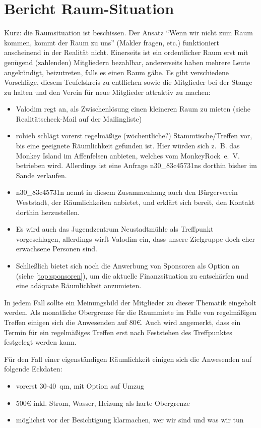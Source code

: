 \documentclass[a4paper,12pt]{scrartcl}
\begin{document}
\section{Bericht Raum-Situation}
\label{top:raum}
Kurz: die Raumsituation ist beschissen. Der Ansatz "`Wenn wir nicht zum Raum 
kommen, kommt der Raum zu uns"' (Makler fragen, etc.) funktioniert anscheinend
in der Realität nicht. Einerseits ist ein ordentlicher Raum erst mit genügend 
(zahlenden) Mitgliedern bezahlbar, andererseits haben mehrere Leute angekündigt,
beizutreten, falls es einen Raum gäbe. Es gibt verschiedene Vorschläge, diesem 
Teufelskreis zu entfliehen sowie die Mitglieder bei der Stange zu halten und den
Verein für neue Mitglieder attraktiv zu machen:
\begin{itemize}
  \item Valodim regt an, als Zwischenlösung einen kleineren Raum zu mieten
    (siehe Realitätscheck-Mail auf der Mailingliste)
  \item rohieb schlägt vorerst regelmäßige (wöchentliche?) Stammtische/Treffen 
    vor, bis eine geeignete Räumlichkeit gefunden ist. Hier würden sich z.~B.
    das Monkey Island im Affenfelsen anbieten, welches vom MonkeyRock~e.~V.
    betrieben wird. Allerdings ist eine Anfrage n30\_83c45731ns dorthin bisher 
    im Sande verlaufen.
  \item n30\_83c45731n nennt in diesem Zusammenhang auch den Bürgerverein 
    Weststadt, der Räumlichkeiten anbietet, und erklärt sich bereit, den Kontakt
    dorthin herzustellen.
  \item Es wird auch das Jugendzentrum Neustadtmühle als Treffpunkt 
    vorgeschlagen, allerdings wirft Valodim ein, dass unsere Zielgruppe doch
    eher erwachsene Personen sind.
  \item Schließlich bietet sich noch die Anwerbung von Sponsoren als Option an
    (siehe \ref{top:sponsoren}), um die aktuelle Finanzsituation zu 
    entschärfen und eine adäquate Räumlichkeit anzumieten.
\end{itemize}

In jedem Fall sollte ein Meinungsbild der Mitglieder zu dieser Thematik 
eingeholt werden. Als monatliche Obergrenze für die Raummiete im Falle von 
regelmäßigen Treffen einigen sich die Anwesenden auf 80€. Auch wird angemerkt,
dass ein Termin für ein regelmäßiges Treffen erst nach Feststehen des 
Treffpunktes festgelegt werden kann.

Für den Fall einer eigenständigen Räumlichkeit einigen sich die Anwesenden auf
folgende Eckdaten:
\begin{itemize}
  \item vorerst 30-40~qm, mit Option auf Umzug
  \item 500€ inkl. Strom, Wasser, Heizung als harte Obergrenze
  \item möglichst vor der Besichtigung klarmachen, wer wir sind und was wir tun
\end{itemize}
\end{document}
